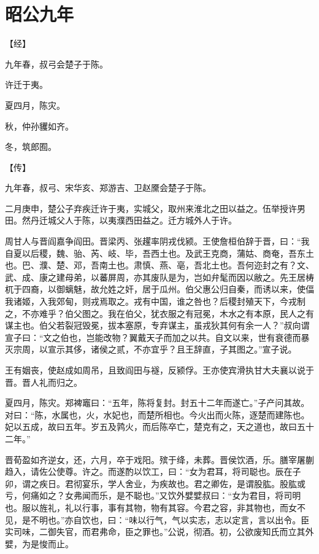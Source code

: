 \documentclass[a4paper,12pt,UTF8,twoside]{ctexbook}
\begin{document}
\section{昭公九年}



【经】

九年春，叔弓会楚子于陈。

许迁于夷。

夏四月，陈灾。

秋，仲孙貜如齐。

冬，筑郎囿。

【传】

九年春，叔弓、宋华亥、郑游吉、卫赵黡会楚子于陈。

二月庚申，楚公子弃疾迁许于夷，实城父，取州来淮北之田以益之。伍举授许男田。然丹迁城父人于陈，以夷濮西田益之。迁方城外人于许。

周甘人与晋阎嘉争阎田。晋梁丙、张趯率阴戎伐颍。王使詹桓伯辞于晋，曰：“我自夏以后稷，魏、骀、芮、岐、毕，吾西土也。及武王克商，蒲姑、商奄，吾东土也。巴、濮、楚、邓，吾南土也。肃慎、燕、亳，吾北土也。吾何迩封之有？文、武、成、康之建母弟，以蕃屏周，亦其废队是为，岂如弁髦而因以敝之。先王居梼杌于四裔，以御螭魅，故允姓之奸，居于瓜州。伯父惠公归自秦，而诱以来，使偪我诸姬，入我郊甸，则戎焉取之。戎有中国，谁之咎也？后稷封殖天下，今戎制之，不亦难乎？伯父图之。我在伯父，犹衣服之有冠冕，木水之有本原，民人之有谋主也。伯父若裂冠毁冕，拔本塞原，专弃谋主，虽戎狄其何有余一人？”叔向谓宣子曰：“文之伯也，岂能改物？翼戴天子而加之以共。自文以来，世有衰德而暴灭宗周，以宣示其侈，诸侯之贰，不亦宜乎？且王辞直，子其图之。”宣子说。

王有姻丧，使赵成如周吊，且致阎田与襚，反颍俘。王亦使宾滑执甘大夫襄以说于晋。晋人礼而归之。

夏四月，陈灾。郑裨竈曰：“五年，陈将复封。封五十二年而遂亡。”子产问其故。对曰：“陈，水属也，火，水妃也，而楚所相也。今火出而火陈，逐楚而建陈也。妃以五成，故曰五年。岁五及鹑火，而后陈卒亡，楚克有之，天之道也，故曰五十二年。”

晋荀盈如齐逆女，还，六月，卒于戏阳。殡于绛，未葬。晋侯饮酒，乐。膳宰屠蒯趋入，请佐公使尊。许之。而遂酌以饮工，曰：“女为君耳，将司聪也。辰在子卯，谓之疾日。君彻宴乐，学人舍业，为疾故也。君之卿佐，是谓股肱。股肱或亏，何痛如之？女弗闻而乐，是不聪也。”又饮外嬖嬖叔曰：“女为君目，将司明也。服以旌礼，礼以行事，事有其物，物有其容。今君之容，非其物也，而女不见，是不明也。”亦自饮也，曰：“味以行气，气以实志，志以定言，言以出令。臣实司味，二御失官，而君弗命，臣之罪也。”公说，彻酒。初，公欲废知氏而立其外嬖，为是悛而止。
\end{document}

